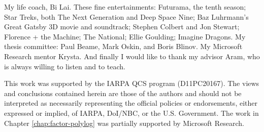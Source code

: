 My life coach, Bi Lai.
These fine entertainments: Futurama, the tenth season; Star Treks, both The Next Generation and Deep Space Nine; Baz Luhrmann's Great Gatsby 3D movie and soundtrack; Stephen Colbert and Jon Stewart;
Florence + the Machine; The National; Ellie Goulding; Imagine Dragons.
My thesis committee: Paul Beame, Mark Oskin, and Boris Blinov.
My Microsoft Research mentor Krysta.
And finally I would like to thank my advisor Aram,
who is always willing to listen and to teach.

This work was supported by
the IARPA QCS program (D11PC20167).  The
views and conclusions contained herein are those of the authors and
should not be interpreted as necessarily representing the official
policies or endorsements, either expressed or implied, of IARPA,
DoI/NBC, or the U.S. Government.
The work in Chapter \ref{chap:factor-polylog}
was partially supported by Microsoft Research.